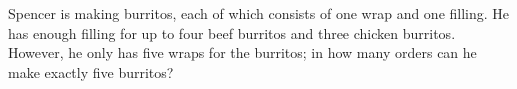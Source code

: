 Spencer is making burritos, each of which consists of one wrap and one filling. He has enough filling for up to four beef burritos and three chicken burritos. However, he only has five wraps for the burritos; in how many orders can he make exactly five burritos?